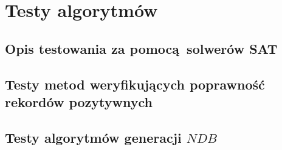 \chapter{Testy algorytmów}

\section{Opis testowania za pomocą solwerów SAT}

\section{Testy metod weryfikujących poprawność rekordów pozytywnych}
\label{sec:red-str-test}

\section{Testy algorytmów generacji $NDB$}
